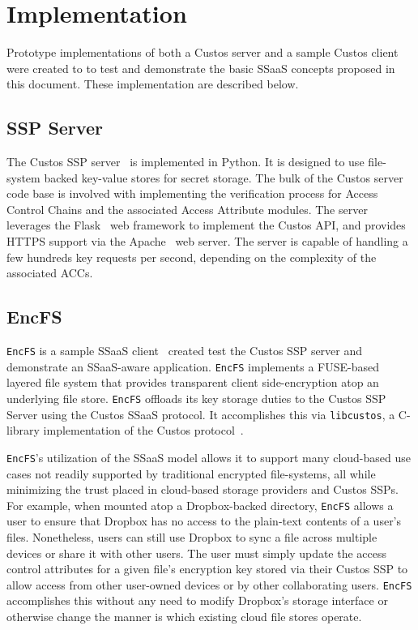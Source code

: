 \section{Implementation}

Prototype implementations of both a Custos server and a sample Custos
client were created to to test and demonstrate the basic SSaaS
concepts proposed in this document. These implementation are described
below.

\subsection{SSP Server}

The Custos SSP server~\cite{custos-repo-server} is implemented in
Python. It is designed to use file-system backed key-value stores for
secret storage. The bulk of the Custos server code base is involved
with implementing the verification process for Access Control Chains
and the associated Access Attribute modules. The server leverages the
Flask~\cite{python-flask} web framework to implement the Custos API,
and provides HTTPS support via the Apache~\cite{apache} web server.
The server is capable of handling a few hundreds key requests per
second, depending on the complexity of the associated ACCs.

\subsection{EncFS}

\texttt{EncFS} is a sample SSaaS client~\cite{custos-repo-encfs}
created test the Custos SSP server and demonstrate an SSaaS-aware
application. \texttt{EncFS} implements a FUSE-based~\cite{fuse}
layered file system that provides transparent client side-encryption
atop an underlying file store. \texttt{EncFS} offloads its key storage
duties to the Custos SSP Server using the Custos SSaaS protocol. It
accomplishes this via \texttt{libcustos}, a C-library implementation
of the Custos protocol~\cite{custos-repo-libcustos}.

\texttt{EncFS}'s utilization of the SSaaS model allows it to support
many cloud-based use cases not readily supported by traditional
encrypted file-systems, all while minimizing the trust placed in
cloud-based storage providers and Custos SSPs. For example, when
mounted atop a Dropbox-backed directory, \texttt{EncFS} allows a user
to ensure that Dropbox has no access to the plain-text contents of a
user's files. Nonetheless, users can still use Dropbox to sync a
file across multiple devices or share it with other users. The user
must simply update the access control attributes for a given file's
encryption key stored via their Custos SSP to allow access from other
user-owned devices or by other collaborating users. \texttt{EncFS}
accomplishes this without any need to modify Dropbox's storage
interface or otherwise change the manner is which existing cloud file
stores operate.

